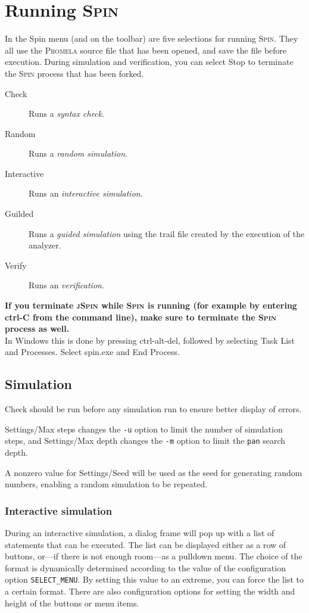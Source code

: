 \documentclass[11pt]{article}
\newcommand{\spn}{\textsc{Spin}}
\newcommand{\prm}{\textsc{Promela}}
\newcommand{\js}{\textsc{jSpin}}
\newcommand{\p}[1]{\texttt{#1}}
\newcommand{\bu}[1]{\textsf{#1}}
\begin{document}
\section{Running \spn{}}\label{s.run}
In the \bu{Spin} menu (and on the toolbar) are five selections for
running \spn{}. They all use the \prm{} source file that has been opened,
and save the file before execution.
During simulation and verification,
you can select \bu{Stop} to terminate the \spn{} process that has been forked.
\begin{description}
\item[\bu{Check}] Runs a \emph{syntax check}.
\item[\bu{Random}] Runs a \emph{random simulation}.
\item[\bu{Interactive}] Runs an \emph{interactive simulation}.
\item[\bu{Guilded}] Runs a \emph{guided simulation} using the trail
file created by the execution of the analyzer.
\item[\bu{Verify}] Runs an \emph{verification}.
\end{description}
\textbf{If you terminate \js{} while \spn{} is running (for example by entering \bu{ctrl-C} from the
command line), make sure to terminate the \spn{} process as well.}\\
In Windows this is done by pressing \bu{ctrl-alt-del}, followed by
selecting \bu{Task List} and \bu{Processes}. Select \bu{spin.exe} and
\bu{End Process}.

\subsection{Simulation}\label{s.sim}
\bu{Check} should be run before any simulation run to ensure better display
of errors.

\bu{Settings/Max steps} changes the \p{-u} option to limit the number of
simulation steps, and \bu{Settings/Max depth} changes the \p{-m} option
to limit the \p{pan} search depth.

A nonzero value for \bu{Settings/Seed} will be used as the seed for generating
random numbers, enabling a random simulation to be repeated.

\subsubsection{Interactive simulation}
During an interactive simulation, a dialog frame will pop up with a list
of statements that can be executed. The list can be displayed either as
a row of buttons, or---if there is not enough room---as a pulldown menu.
The choice of the format is dynamically determined according to the
value of the configuration option \p{SELECT\_MENU}. By setting this
value to an extreme, you can force the list to a certain format. There
are also configuration options for setting the width and height of the
buttons or menu items.
\end{document}
